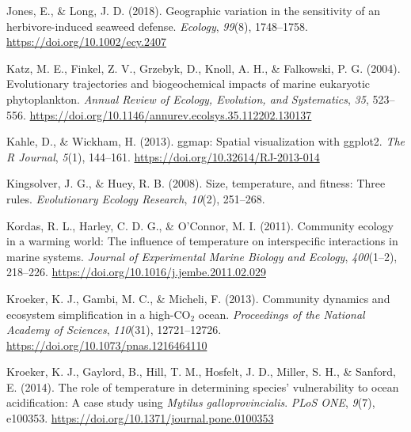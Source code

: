 \documentclass{CSUNthesis}
\begin{document}
\vspace{0.1em}

Jones, E., \& Long, J. D. (2018). Geographic variation in the sensitivity of an herbivore-induced seaweed defense. \textit{Ecology}, \textit{99}(8), 1748--1758. \url{https://doi.org/10.1002/ecy.2407}

\vspace{0.1em}

Katz, M. E., Finkel, Z. V., Grzebyk, D., Knoll, A. H., \& Falkowski, P. G. (2004). Evolutionary trajectories and biogeochemical impacts of marine eukaryotic phytoplankton. \textit{Annual Review of Ecology, Evolution, and Systematics}, \textit{35}, 523--556. \url{https://doi.org/10.1146/annurev.ecolsys.35.112202.130137}

\vspace{0.1em}

Kahle, D., \& Wickham, H. (2013). ggmap: Spatial visualization with ggplot2. \textit{The R Journal}, \textit{5}(1), 144--161. \url{https://doi.org/10.32614/RJ-2013-014}

\vspace{0.1em}

Kingsolver, J. G., \& Huey, R. B. (2008). Size, temperature, and fitness: Three rules. \textit{Evolutionary Ecology Research}, \textit{10}(2), 251--268.

\vspace{0.1em}

Kordas, R. L., Harley, C. D. G., \& O'Connor, M. I. (2011). Community ecology in a warming world: The influence of temperature on interspecific interactions in marine systems. \textit{Journal of Experimental Marine Biology and Ecology}, \textit{400}(1--2), 218--226. \url{https://doi.org/10.1016/j.jembe.2011.02.029}

\vspace{0.1em}

Kroeker, K. J., Gambi, M. C., \& Micheli, F. (2013). Community dynamics and ecosystem simplification in a high-CO\(_2\) ocean. \textit{Proceedings of the National Academy of Sciences}, \textit{110}(31), 12721--12726. \url{https://doi.org/10.1073/pnas.1216464110}

\vspace{0.1em}

Kroeker, K. J., Gaylord, B., Hill, T. M., Hosfelt, J. D., Miller, S. H., \& Sanford, E. (2014). The role of temperature in determining species' vulnerability to ocean acidification: A case study using \textit{Mytilus galloprovincialis}. \textit{PLoS ONE}, \textit{9}(7), e100353. \url{https://doi.org/10.1371/journal.pone.0100353}
\end{document}
